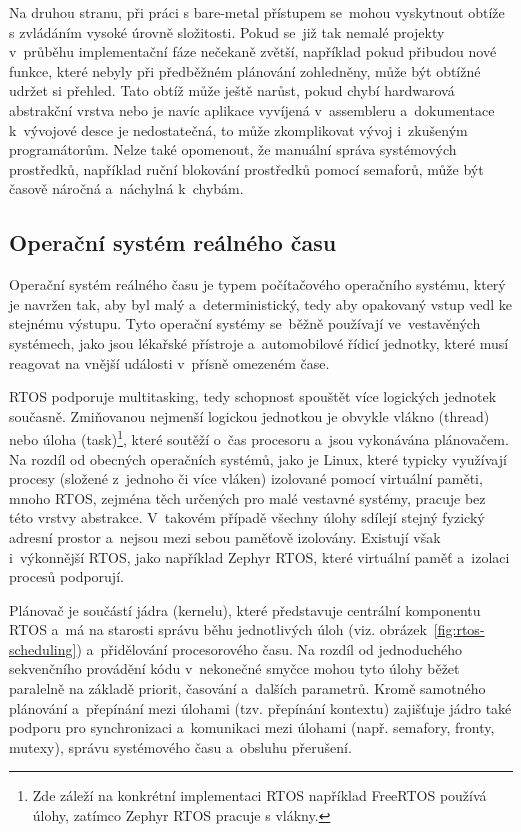 Na druhou stranu, při práci s bare-metal přístupem se~mohou vyskytnout obtíže s zvládáním vysoké úrovně složitosti. Pokud se~již tak nemalé projekty v~průběhu implementační fáze nečekaně zvětší, například pokud přibudou nové funkce, které nebyly při předběžném plánování zohledněny, může být obtížné udržet si přehled. Tato obtíž může ještě narůst, pokud chybí hardwarová abstrakční vrstva nebo je navíc aplikace vyvíjená v~assembleru a~dokumentace k~vývojové desce je nedostatečná, to může zkomplikovat vývoj i~zkušeným programátorům. Nelze také opomenout, že manuální správa systémových prostředků, například ruční blokování prostředků pomocí semaforů, může být časově náročná a~náchylná k~chybám.~\cite{sysgo_baremetal_vs_rtos}

\subsection{Operační systém reálného času}
Operační systém reálného času je typem počítačového operačního systému, který je navržen tak, aby byl malý a~deterministický, tedy aby opakovaný vstup vedl ke stejnému výstupu. Tyto operační systémy se~běžně používají ve~vestavěných systémech, jako jsou lékařské přístroje a~automobilové řídicí jednotky, které musí reagovat na vnější události v~přísně omezeném čase.~\cite{freertos_what_is_rtos}

RTOS podporuje multitasking, tedy schopnost spouštět více logických jednotek současně. Zmiňovanou nejmenší logickou jednotkou je obvykle vlákno (thread) nebo úloha (task)\footnote{Zde záleží na konkrétní implementaci RTOS například FreeRTOS používá úlohy, zatímco Zephyr RTOS pracuje s vlákny.}, které soutěží o~čas procesoru a~jsou vykonávána plánovačem. Na rozdíl od obecných operačních systémů, jako je Linux, které typicky využívají procesy (složené z~jednoho či více vláken) izolované pomocí virtuální paměti, mnoho RTOS, zejména těch určených pro malé vestavné systémy, pracuje bez této vrstvy abstrakce. V~takovém případě všechny úlohy sdílejí stejný fyzický adresní prostor a~nejsou mezi sebou paměťově izolovány. Existují však i~výkonnější RTOS, jako například Zephyr RTOS, které virtuální paměť a~izolaci procesů podporují.~\cite{freertos_what_is_rtos}

Plánovač je součástí jádra (kernelu), které představuje centrální komponentu RTOS a~má na starosti správu běhu jednotlivých úloh (viz. obrázek~\ref{fig:rtos-scheduling}) a~přidělování procesorového času. Na rozdíl od jednoduchého sekvenčního provádění kódu v~nekonečné smyčce mohou tyto úlohy běžet paralelně na základě priorit, časování a~dalších parametrů. Kromě samotného plánování a~přepínání mezi úlohami (tzv. přepínání kontextu) zajišťuje jádro také podporu pro synchronizaci a~komunikaci mezi úlohami (např. semafory, fronty, mutexy), správu systémového času a~obsluhu přerušení.~\cite{freertos_book}

